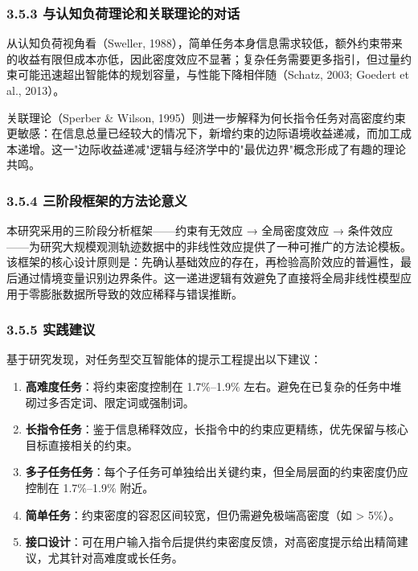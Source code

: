 \documentclass[12pt,a4paper,openany,oneside]{ctexrep}
\begin{document}
\subsubsection{3.5.3 与认知负荷理论和关联理论的对话}


从认知负荷视角看（Sweller, 1988），简单任务本身信息需求较低，额外约束带来的收益有限但成本亦低，因此密度效应不显著；复杂任务需要更多指引，但过量约束可能迅速超出智能体的规划容量，与性能下降相伴随（Schatz, 2003; Goedert et al., 2013）。

关联理论（Sperber \& Wilson, 1995）则进一步解释为何长指令任务对高密度约束更敏感：在信息总量已经较大的情况下，新增约束的边际语境收益递减，而加工成本递增。这一"边际收益递减"逻辑与经济学中的"最优边界"概念形成了有趣的理论共鸣。

\subsubsection{3.5.4 三阶段框架的方法论意义}


本研究采用的三阶段分析框架——约束有无效应 → 全局密度效应 → 条件效应——为研究大规模观测轨迹数据中的非线性效应提供了一种可推广的方法论模板。该框架的核心设计原则是：先确认基础效应的存在，再检验高阶效应的普遍性，最后通过情境变量识别边界条件。这一递进逻辑有效避免了直接将全局非线性模型应用于零膨胀数据所导致的效应稀释与错误推断。

\subsubsection{3.5.5 实践建议}


基于研究发现，对任务型交互智能体的提示工程提出以下建议：

\begin{enumerate}
\item[1.] \textbf{高难度任务}：将约束密度控制在 1.7\%–1.9\% 左右。避免在已复杂的任务中堆砌过多否定词、限定词或强制词。
\item[2.] \textbf{长指令任务}：鉴于信息稀释效应，长指令中的约束应更精练，优先保留与核心目标直接相关的约束。
\item[3.] \textbf{多子任务任务}：每个子任务可单独给出关键约束，但全局层面的约束密度仍应控制在 1.7\%–1.9\% 附近。
\item[4.] \textbf{简单任务}：约束密度的容忍区间较宽，但仍需避免极端高密度（如 > 5\%）。
\item[5.] \textbf{接口设计}：可在用户输入指令后提供约束密度反馈，对高密度提示给出精简建议，尤其针对高难度或长任务。
\end{enumerate}
\end{document}

